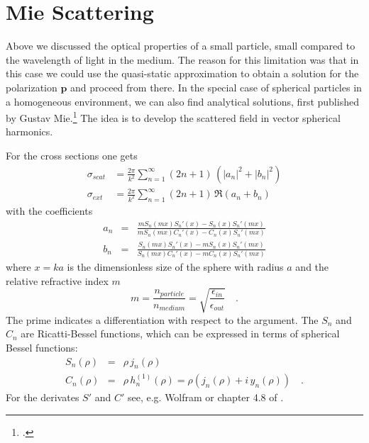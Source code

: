 \section{Mie Scattering}

Above we discussed the optical properties of a small particle, small compared to the wavelength of light in the medium. The reason for this limitation was that in this case we could use the quasi-static approximation to obtain a solution for the polarization $\mathbf{p}$ and proceed from there. In the special case of spherical particles in a homogeneous environment, we can also find analytical solutions, first published by Gustav Mie.\footcite[chapter 4]{BH-book} The idea is to develop the scattered field in vector spherical harmonics.

For the cross sections one gets
\begin{eqnarray}
\sigma_{scat} & = \frac{2 \pi }{k^2} \sum\limits_{n=1}^{\infty} (2 n+1) \, \left( |a_n|^2 + |b_n|^2 \right) \\
\sigma_{ext} & = \frac{2 \pi }{k^2} \sum\limits_{n=1}^{\infty} ( 2n+1)\, \Re \left( a_n + b_n \right) 
\end{eqnarray}
%
with the coefficients
%
\begin{eqnarray}
 a_n &= & \frac{m S_n (m x) S_n' (x) - S_n (x) S_n' (m x)}
 {m S_n (m x) C_n' (x) -  C_n (x) S_n' (m x)}  \\
 b_n &=  &\frac{S_n (m x) S_n' (x) - m S_n (x) S_n' (mx)}
  {S_n (mx) C_n' (x) - m C_n (x) S_n' (m x)} 
\end{eqnarray}
where $x =k a $ is the dimensionless size of the sphere with radius $a$ and the relative refractive index $m$
\begin{equation}
  m = \frac{n_{particle} }{ n_{medium}} = \sqrt{\frac{\epsilon_{in}}{\epsilon_{out}}} \quad .
\end{equation}
The prime indicates a differentiation with respect to the argument. The $S_n$ and $C_n$ are Ricatti-Bessel functions, which can be expressed in terms of spherical Bessel functions:
\begin{eqnarray}
S_n ( \rho) & =& \rho \, j_n (\rho) \\
C_n (\rho)  &= & \rho \, h_n^{(1)} (\rho)  = \rho \left(  j_n (\rho)  + i \,  y_n (\rho) \right) \quad .
\end{eqnarray}
For the derivates $S'$ and $C'$ see, e.g. Wolfram or chapter 4.8 of \cite{BH-book}.

